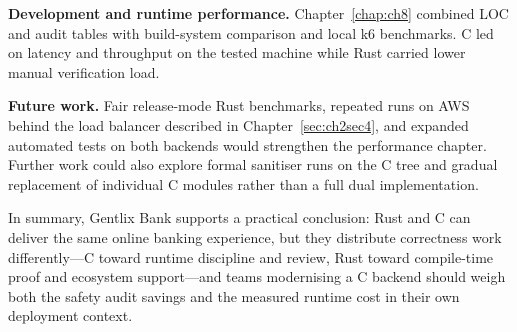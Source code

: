 \par \textbf{Development and runtime performance.} Chapter~\ref{chap:ch8} combined LOC and 
audit tables with build-system comparison and local k6 benchmarks. C led on latency and 
throughput on the tested machine while Rust carried lower manual verification load.

\par \textbf{Future work.} Fair release-mode Rust benchmarks, repeated runs on AWS behind 
the load balancer described in Chapter~\ref{sec:ch2sec4}, and expanded automated tests on 
both backends would strengthen the performance chapter. Further work could also explore 
formal sanitiser runs on the C tree and gradual replacement of individual C modules rather 
than a full dual implementation.

\par In summary, Gentlix Bank supports a practical conclusion: Rust and C can deliver the 
same online banking experience, but they distribute correctness work differently---C toward 
runtime discipline and review, Rust toward compile-time proof and ecosystem support---and 
teams modernising a C backend should weigh both the safety audit savings and the measured 
runtime cost in their own deployment context.
